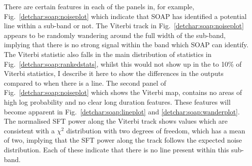 %
There are certain features in each of the panels in, for example, Fig.~\ref{detchar:soap:noiseplot} which indicate that SOAP has identified a potential line within a sub-band or not.
The Viterbi track in Fig.~\ref{detchar:soap:noiseplot} appears to be randomly wandering around the full width of the sub-band, implying that there is no strong signal within the band which SOAP can identify.
The Viterbi statistic also falls in the main distribution of statistics in Fig.~\ref{detchar:soap:rankedstats}, whilst this would not show up in the to 10\% of Viterbi statistics, I describe it here to show the differences in the outputs compared to when there is a line.
The second panel of Fig.~\ref{detchar:soap:noiseplot} which shows the Viterbi map, contains no areas of high log probability and no clear long duration features. These features will become apparent in Fig.~\ref{detchar:soap:lineplot} and \ref{detchar:soap:wanderplot}.
The normalised \gls{SFT} power along the Viterbi track shows values which are consistent with a $\chi^2$ distribution with two degrees of freedom, which has a mean of two, implying that the \gls{SFT} power along the track follows the expected noise distribution.
Each of these indicate that there is no line present within this sub-band.
%
